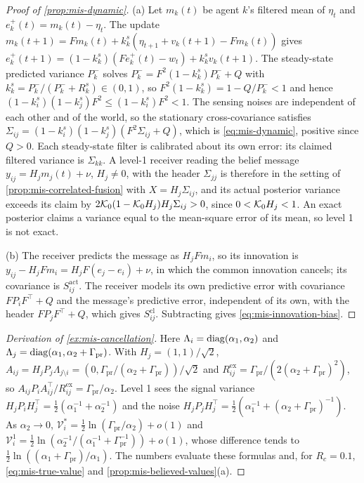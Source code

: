 \begin{proof}[Proof of \cref{prop:mis-dynamic}]
(a) Let $m_k(t)$ be agent $k$'s filtered mean of $\eta_t$ and $e^+_k(t)=m_k(t)-\eta_t$. The update $m_k(t+1)=Fm_k(t)+k^s_k(\eta_{t+1}+v_k(t+1)-Fm_k(t))$ gives $e^+_k(t+1)=(1-k^s_k)(Fe^+_k(t)-w_t)+k^s_kv_k(t+1)$. The steady-state predicted variance $P^-_k$ solves $P^-_k=F^2(1-k^s_k)P^-_k+Q$ with $k^s_k=P^-_k/(P^-_k+R^s_k)\in(0,1)$, so $F^2(1-k^s_k)=1-Q/P^-_k<1$ and hence $(1-k^s_i)(1-k^s_j)F^2\le(1-k^s_i)F^2<1$. The sensing noises are independent of each other and of the world, so the stationary cross-covariance satisfies $\Sigma_{ij}=(1-k^s_i)(1-k^s_j)(F^2\Sigma_{ij}+Q)$, which is \eqref{eq:mis-dynamic}, positive since $Q>0$. Each steady-state filter is calibrated about its own error: its claimed filtered variance is $\Sigma_{kk}$. A level-1 receiver reading the belief message $y_{ij}=H_jm_j(t)+\nu$, $H_j\neq0$, with the header $\Sigma_{jj}$ is therefore in the setting of \cref{prop:mis-correlated-fusion} with $X=H_j\Sigma_{ij}$, and its actual posterior variance exceeds its claim by $2\mathcal{K}_0(1-\mathcal{K}_0H_j)H_j\Sigma_{ij}>0$, since $0<\mathcal{K}_0H_j<1$. An exact posterior claims a variance equal to the mean-square error of its mean, so level 1 is not exact.

(b) The receiver predicts the message as $H_jFm_i$, so its innovation is $y_{ij}-H_jFm_i=H_jF(e_j-e_i)+\nu$, in which the common innovation cancels; its covariance is $S^{\mathrm{act}}_{ij}$. The receiver models its own predictive error with covariance $FP_iF^\top+Q$ and the message's predictive error, independent of its own, with the header $FP_jF^\top+Q$, which gives $S^{\mathrm{cl}}_{ij}$. Subtracting gives \eqref{eq:mis-innovation-bias}.
\end{proof}

\begin{proof}[Derivation of \cref{ex:mis-cancellation}]
Here $\Lambda_i=\operatorname{diag}(\alpha_1,\alpha_2)$ and $\Lambda_j=\operatorname{diag}(\alpha_1,\alpha_2+\Gamma_{\mathrm{pr}})$. With $H_j=(1,1)/\sqrt2$, $A_{ij}=H_jP_j\Lambda_{j\setminus i}=(0,\Gamma_{\mathrm{pr}}/(\alpha_2+\Gamma_{\mathrm{pr}}))/\sqrt2$ and $R^{\mathrm{ex}}_{ij}=\Gamma_{\mathrm{pr}}/(2(\alpha_2+\Gamma_{\mathrm{pr}})^2)$, so $A_{ij}P_iA_{ij}^\top/R^{\mathrm{ex}}_{ij}=\Gamma_{\mathrm{pr}}/\alpha_2$. Level 1 sees the signal variance $H_jP_iH_j^\top=\tfrac12(\alpha_1^{-1}+\alpha_2^{-1})$ and the noise $H_jP_jH_j^\top=\tfrac12(\alpha_1^{-1}+(\alpha_2+\Gamma_{\mathrm{pr}})^{-1})$. As $\alpha_2\to0$, $\mathcal V^\ast_i=\tfrac12\ln(\Gamma_{\mathrm{pr}}/\alpha_2)+o(1)$ and $\mathcal V^1_i=\tfrac12\ln(\alpha_2^{-1}/(\alpha_1^{-1}+\Gamma_{\mathrm{pr}}^{-1}))+o(1)$, whose difference tends to $\tfrac12\ln((\alpha_1+\Gamma_{\mathrm{pr}})/\alpha_1)$. The numbers evaluate these formulas and, for $R_c=0.1$, \eqref{eq:mis-true-value} and \cref{prop:mis-believed-values}(a).
\end{proof}


